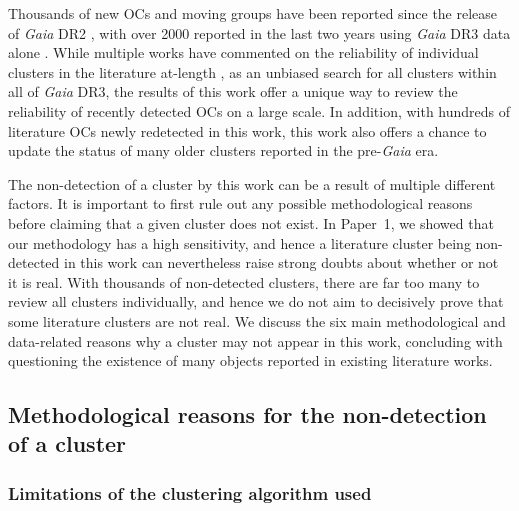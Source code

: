 Thousands of new OCs and moving groups have been reported since the release of \emph{Gaia} DR2 \citep{brown_gaia_2018}, with over 2000 reported in the last two years using \emph{Gaia} DR3 data alone \citep{gaia_collaboration_gaia_2021}. While multiple works have commented on the reliability of individual clusters in the literature at-length \citep[e.g.][]{cantat-gaudin_clusters_2020, piatti_assessing_2023}, as an unbiased search for all clusters within all of \emph{Gaia} DR3, the results of this work offer a unique way to review the reliability of recently detected OCs on a large scale. In addition, with hundreds of literature OCs newly redetected in this work, this work also offers a chance to update the status of many older clusters reported in the pre-\emph{Gaia} era.

The non-detection of a cluster by this work can be a result of multiple different factors. It is important to first rule out any possible methodological reasons before claiming that a given cluster does not exist. In Paper~1, we showed that our methodology has a high sensitivity, and hence a literature cluster being non-detected in this work can nevertheless raise strong doubts about whether or not it is real. With thousands of non-detected clusters, there are far too many to review all clusters individually, and hence we do not aim to decisively prove that some literature clusters are not real. We discuss the six main methodological and data-related reasons why a cluster may not appear in this work, concluding with questioning the existence of many objects reported in existing literature works.



\subsection{Methodological reasons for the non-detection of a cluster}\label{c3:sec:discussion-undetected:methodological-reasons}
\subsubsection{Limitations of the clustering algorithm used}\label{c3:sec:discussion-undetected:methodological-reasons:1-algorithm}

